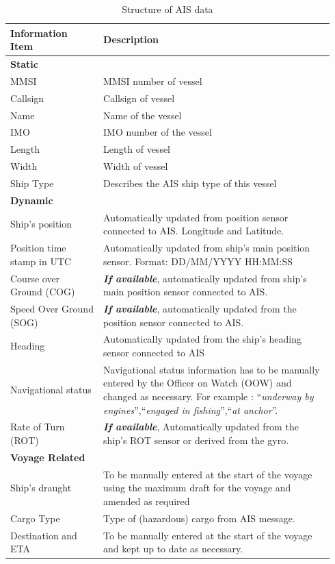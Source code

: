 \begin{table}[h!]
    \footnotesize
    \centering
    {\begin{tabular}{ p{0.27\linewidth} p{0.67\linewidth}  }
    \hline
    \textbf{Information Item} & \textbf{Description} \\
    \hline
    \multicolumn{2}{l}{\textbf{Static}}\\
    \hline
    MMSI & MMSI number of vessel\\
    Callsign & Callsign of vessel \\
    Name & Name of the vessel \\
    IMO & IMO number of the vessel \\
    Length & Length of vessel \\
    Width & Width of vessel \\
    Ship Type & Describes the AIS ship type of this vessel \\
    \hline
    \multicolumn{2}{l}{\textbf{Dynamic}}\\
    \hline
    Ship's position & Automatically updated from position sensor connected to AIS. Longitude and Latitude.\\
    Position time stamp in UTC & Automatically updated from ship's main position sensor. Format: DD\slash MM\slash YYYY HH:MM:SS\\
    Course over Ground (COG) & \emph{\textbf{If available}}, automatically updated from ship's main position sensor connected to AIS.\\  
    Speed Over Ground (SOG) & \emph{\textbf{If available}}, automatically updated from the position sensor connected to AIS.\\
    Heading & Automatically updated from the ship's heading sensor connected to AIS\\
    Navigational status & Navigational status information has to be manually entered by the Officer on Watch (OOW) and changed as necessary. For example : ``\emph{underway by engines}'',``\emph{engaged in fishing}'',``\emph{at anchor}''.\\
    Rate of Turn (ROT) & \emph{\textbf{If available}}, Automatically updated from the ship's ROT sensor or derived from
    the gyro.\\
    \hline
    \multicolumn{2}{l}{\textbf{Voyage Related}}\\
    \hline
    Ship's draught & To be manually entered at the start of the voyage using the
    maximum draft for the voyage and amended as required \\
    Cargo Type & Type of (hazardous) cargo from AIS message.\\
    Destination and ETA & To be manually entered at the start of the voyage and kept up to
    date as necessary.\\
    \hline
    \end{tabular}}
\caption{Structure of AIS data }\label{tbl:AIS_struct}
\end{table}

